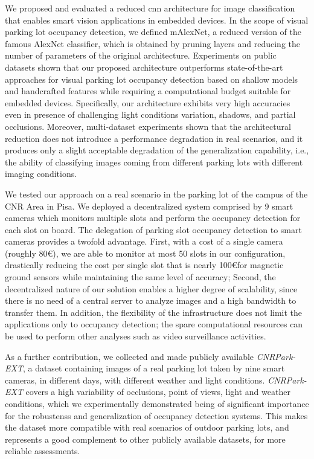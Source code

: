 We proposed and evaluated a reduced \acrlong{cnn} architecture for image classification that enables smart vision applications in embedded devices.
In the scope of visual parking lot occupancy detection, we defined mAlexNet, a reduced version of the famous AlexNet classifier, which is obtained by pruning layers and reducing the number of parameters of the original architecture.
Experiments on public datasets shown that our proposed architecture outperforms state-of-the-art approaches for visual parking lot occupancy detection based on shallow models and handcrafted features while requiring a computational budget suitable for embedded devices.
Specifically, our architecture exhibits very high accuracies even in presence of challenging light conditions variation, shadows, and partial occlusions.
Moreover, multi-dataset experiments shown that the architectural reduction does not introduce a performance degradation in real scenarios, and it produces only a slight acceptable degradation of the generalization capability, i.e., the ability of classifying images coming from different parking lots with different imaging conditions.

We tested our approach on a real scenario in the parking lot of the campus of the CNR Area in Pisa.
We deployed a decentralized system comprised by 9 smart cameras which monitors multiple slots and perform the occupancy detection for each slot on board.
The delegation of parking slot occupancy detection to smart cameras provides a twofold advantage.
First, with a cost of a single camera (roughly 80\euro), we are able to monitor at most 50 slots in our configuration, drastically reducing the cost per single slot that is nearly 100\euro for magnetic ground sensors while maintaining the same level of accuracy;
Second, the decentralized nature of our solution enables a higher degree of scalability, since there is no need of a central server to analyze images and a high bandwidth to transfer them.
In addition, the flexibility of the infrastructure does not limit the applications only to occupancy detection;
the spare computational resources can be used to perform other analyses such as video surveillance activities.

As a further contribution, we collected and made publicly available \emph{CNRPark-EXT}, a dataset containing images of a real parking lot taken by nine smart cameras, in different days, with different weather and light conditions.
\emph{CNRPark-EXT} covers a high variability of occlusions, point of views, light and weather conditions, which we experimentally demonstrated being of significant importance for the robustenss and generalization of occupancy detection systems.
This makes the dataset more compatible with real scenarios of outdoor parking lots, and represents a good complement to other publicly available datasets, for more reliable assessments.

